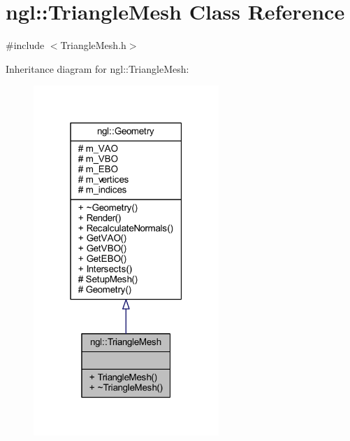 \hypertarget{classngl_1_1_triangle_mesh}{}\section{ngl\+:\+:Triangle\+Mesh Class Reference}
\label{classngl_1_1_triangle_mesh}


{\ttfamily \#include $<$Triangle\+Mesh.\+h$>$}



Inheritance diagram for ngl\+:\+:Triangle\+Mesh\+:
\nopagebreak
\begin{figure}[H]
\begin{center}
\leavevmode
\includegraphics[width=199pt]{classngl_1_1_triangle_mesh__inherit__graph}
\end{center}
\end{figure}


